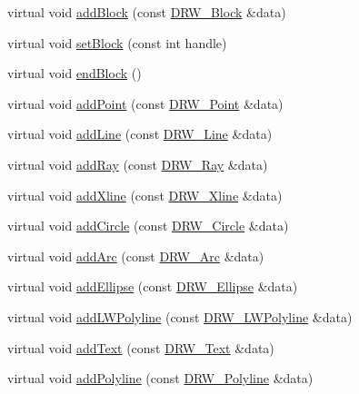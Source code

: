 \begin{DoxyCompactItemize}
\item 
virtual void \hyperlink{classRS__FilterDXFRW_ac6d96347537b15a9b9956a0835f106ea}{add\-Block} (const \hyperlink{classDRW__Block}{D\-R\-W\-\_\-\-Block} \&data)
\item 
virtual void \hyperlink{classRS__FilterDXFRW_a661e481f1ae165fe48a9259bc9bb999e}{set\-Block} (const int handle)
\item 
virtual void \hyperlink{classRS__FilterDXFRW_aabe2e2511566dedb786ab8ecf13212cf}{end\-Block} ()
\item 
virtual void \hyperlink{classRS__FilterDXFRW_aa0d447fd70b661fde371a0f1df959c57}{add\-Point} (const \hyperlink{classDRW__Point}{D\-R\-W\-\_\-\-Point} \&data)
\item 
virtual void \hyperlink{classRS__FilterDXFRW_a1a43390e6d753aa3460024be11994c91}{add\-Line} (const \hyperlink{classDRW__Line}{D\-R\-W\-\_\-\-Line} \&data)
\item 
virtual void \hyperlink{classRS__FilterDXFRW_a9f2cc36d3f3d864a8051d846b585532e}{add\-Ray} (const \hyperlink{classDRW__Ray}{D\-R\-W\-\_\-\-Ray} \&data)
\item 
virtual void \hyperlink{classRS__FilterDXFRW_a301661751967a4add4151e3243c3ff5a}{add\-Xline} (const \hyperlink{classDRW__Xline}{D\-R\-W\-\_\-\-Xline} \&data)
\item 
virtual void \hyperlink{classRS__FilterDXFRW_ac2f5b87c5a83e41262565dcbd85315ea}{add\-Circle} (const \hyperlink{classDRW__Circle}{D\-R\-W\-\_\-\-Circle} \&data)
\item 
virtual void \hyperlink{classRS__FilterDXFRW_acf5c7763ee60a92025968af9d97dd9cf}{add\-Arc} (const \hyperlink{classDRW__Arc}{D\-R\-W\-\_\-\-Arc} \&data)
\item 
virtual void \hyperlink{classRS__FilterDXFRW_a19075f161d0842325b62da5e3971458f}{add\-Ellipse} (const \hyperlink{classDRW__Ellipse}{D\-R\-W\-\_\-\-Ellipse} \&data)
\item 
virtual void \hyperlink{classRS__FilterDXFRW_a5959562c50fff784f93db03eba88f5fc}{add\-L\-W\-Polyline} (const \hyperlink{classDRW__LWPolyline}{D\-R\-W\-\_\-\-L\-W\-Polyline} \&data)
\item 
virtual void \hyperlink{classRS__FilterDXFRW_af0040cc52f9f9688a0afe43952be2086}{add\-Text} (const \hyperlink{classDRW__Text}{D\-R\-W\-\_\-\-Text} \&data)
\item 
virtual void \hyperlink{classRS__FilterDXFRW_a46508004c72a25bab4c05f75e0372df1}{add\-Polyline} (const \hyperlink{classDRW__Polyline}{D\-R\-W\-\_\-\-Polyline} \&data)
\item 

\end{DoxyCompactItemize}
